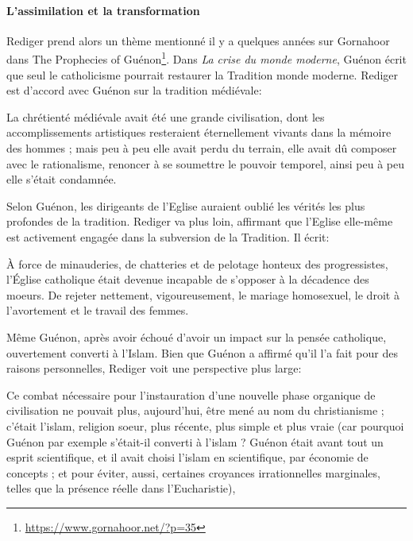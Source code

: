 \paragraph{L'assimilation et la transformation}


Rediger prend alors un thème mentionné il y a quelques années sur Gornahoor dans The Prophecies of Guénon\footnote{\url{https://www.gornahoor.net/?p=35}}. Dans \emph{La crise du monde moderne}, Guénon écrit que seul le catholicisme pourrait restaurer la Tradition monde moderne. Rediger est d'accord avec Guénon sur la tradition médiévale:

\begin{quotex}
La chrétienté médiévale avait été une grande civilisation, dont les accomplissements artistiques resteraient éternellement vivants dans la mémoire des hommes ; mais peu à peu elle avait perdu du terrain, elle avait dû composer avec le rationalisme, renoncer à se soumettre le pouvoir temporel, ainsi peu à peu elle s'était condamnée.
\end{quotex}


Selon Guénon, les dirigeants de l'Eglise auraient oublié les vérités les plus profondes de la tradition. Rediger va plus loin, affirmant que l'Eglise elle-même est activement engagée dans la subversion de la Tradition. Il écrit:

\begin{quotex}
À force de minauderies, de chatteries et de pelotage honteux des progressistes, l'Église catholique était devenue incapable de s'opposer à la décadence des moeurs. De rejeter nettement, vigoureusement, le mariage homosexuel, le droit à l'avortement et le travail des femmes.
\end{quotex}


Même Guénon, après avoir échoué d'avoir un impact sur la pensée catholique, ouvertement converti à l'Islam. Bien que Guénon a affirmé qu'il l'a fait pour des raisons personnelles, Rediger voit une perspective plus large:

\begin{quotex}
Ce combat nécessaire pour l'instauration d'une nouvelle phase organique de civilisation ne pouvait plus, aujourd'hui, être mené au nom du christianisme ; c'était l'islam, religion soeur, plus récente, plus simple et plus vraie (car pourquoi Guénon par exemple s'était-il converti à l'islam ? Guénon était avant tout un esprit scientifique, et il avait choisi l'islam en scientifique, par économie de concepts ; et pour éviter, aussi, certaines croyances irrationnelles marginales, telles que la présence réelle dans l'Eucharistie),
\end{quotex}


